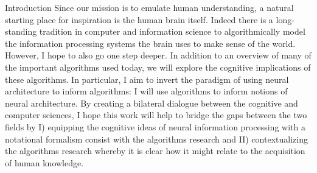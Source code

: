 \documentclass[12pt]{pom_thesis}
\begin{document}
\begin{chapter}{Introduction}
	Since our mission is to emulate human understanding, a natural starting place for inspiration is the human brain itself. Indeed there is a long-standing tradition in computer and information science to algorithmically model the information processing systems the brain uses to make sense of the world. However, I hope to also go one step deeper. In addition to an overview of many of the important algorithms used today, we will explore the cognitive implications of these algorithms. In particular, I aim to invert the paradigm of using neural architecture to inform algorithms: I will use algorithms to inform notions of neural architecture. By creating a bilateral dialogue between the cognitive and computer sciences, I hope this work will help to bridge the gaps between the two fields by I) equipping the cognitive ideas of neural information processing with a notational formalism consist with the algorithms research and II) contextualizing the algorithms research whereby it is clear how it might relate to the acquisition of human knowledge.
\end{chapter}
\end{document}
